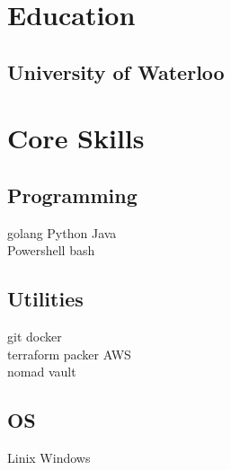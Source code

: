\documentclass[]{deedy-resume}
\begin{document}
\begin{minipage}[t]{0.33\textwidth} %


\section{Education} 

\subsection{University of Waterloo}



\section{Core Skills}

\subsection{Programming}
golang \textbullet{} Python \textbullet{} Java \\
Powershell \textbullet{} bash \\ 
\sectionsep

\subsection{Utilities}
git \textbullet{} docker \\
terraform \textbullet{} packer \textbullet{} AWS \\
nomad \textbullet{} vault \\
\sectionsep

\subsection{OS}
Linix \textbullet{} Windows \\
\sectionsep



\end{minipage}
\end{document}
